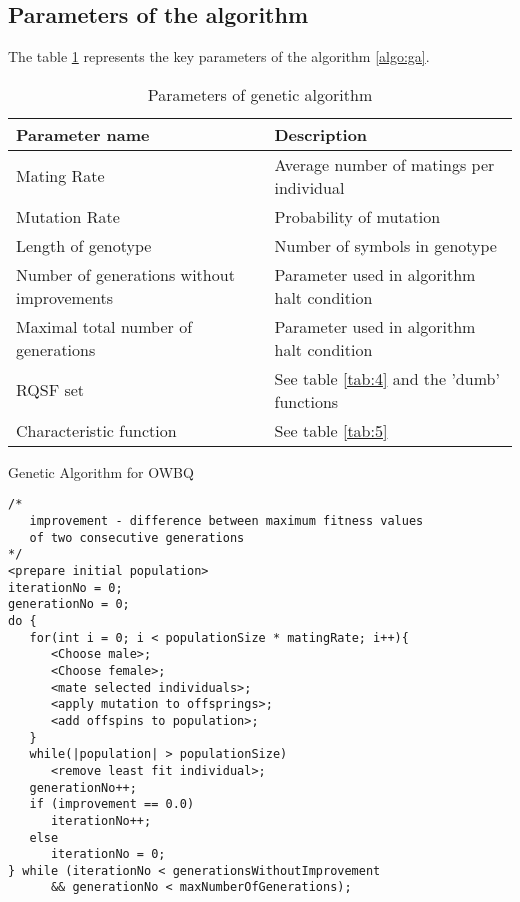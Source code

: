 \documentclass[11pt]{article}
\begin{document}
\subsection{Parameters of the algorithm}
The table \ref{tab:6} represents the key parameters of the  algorithm \ref{algo:ga}.
\begin{table}[ht]
\begin{center}
\begin{tabular}{|m{55mm}|m{80mm}|} \hline 
\textsf{Parameter name} & \textsf{Description} \\ \hline\hline
Mating Rate & Average number of matings per individual \\ \hline
Mutation Rate & Probability of mutation \\ \hline  
Length of genotype & Number of symbols in genotype \\ \hline
Number of generations without improvements & Parameter used in algorithm halt condition \\ \hline
Maximal total number of generations & Parameter used in algorithm halt condition \\ \hline
RQSF set & See table \ref{tab:4} and the 'dumb' functions\\ \hline
Characteristic function &  See table \ref{tab:5} \\ \hline
\end{tabular}
\end{center}
\caption{Parameters of genetic algorithm\label{tab:6}}
\end{table}

%
%
%

\begin{algo}
\large
\caption{{\large Genetic Algorithm for OWBQ}\label{algo:ga}}
\begin{verbatim}
/*
   improvement - difference between maximum fitness values 
   of two consecutive generations
*/
<prepare initial population>
iterationNo = 0;
generationNo = 0;
do {
   for(int i = 0; i < populationSize * matingRate; i++){
      <Choose male>;
      <Choose female>;
      <mate selected individuals>;
      <apply mutation to offsprings>; 
      <add offspins to population>;
   }
   while(|population| > populationSize)
      <remove least fit individual>;
   generationNo++;
   if (improvement == 0.0)
      iterationNo++;
   else
      iterationNo = 0;
} while (iterationNo < generationsWithoutImprovement 
      && generationNo < maxNumberOfGenerations);     
\end{verbatim}
\normalsize
\end{algo}
\end{document}
